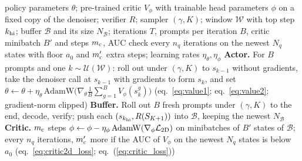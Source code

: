 \begin{algorithm}[t]
\caption{Joint training of the policy and critic.}
\label{alg:jpc}
\small
\begin{algorithmic}[1]
\REQUIRE policy parameters $\theta$; pre-trained critic $V_\phi$ with trainable head parameters $\phi$ on a fixed copy of the denoiser; verifier $R$; sampler $(\gamma,K)$; window $\mathcal W$ with top step $k_{\rm hi}$; buffer $\mathcal B$ and its size $N_{\mathcal B}$; iterations $T$, prompts per iteration $B$, critic minibatch $B'$ and steps $m_{\rm c}$, AUC check every $n_q$ iterations on the newest $N_q$ states with floor $a_0$ and $m'_{\rm c}$ extra steps; learning rates $\eta_\theta,\eta_\phi$
  \STATE \textbf{Actor.} For $B$ prompts and one $k\sim\mathcal U(\mathcal W)$: roll out under $(\gamma,K)$ to $s_{k-1}$ without gradients, take the denoiser call at $s_{k-1}$ with gradients to form $s_k$, and set $\theta\leftarrow\theta+\eta_\theta\,\mathrm{AdamW}\big(\nabla_\theta\frac1B\sum_{g=1}^{B}V_\phi(s^g_k)\big)$ \hfill (eq.~\ref{eq:value1}; eq.~\ref{eq:value2}; gradient-norm clipped)
  \STATE \textbf{Buffer.} Roll out $B$ fresh prompts under $(\gamma,K)$ to the end, decode, verify; push each $(s_{k_{\rm hi}},R(S_{K+1}))$ into $\mathcal B$, keeping the newest $N_{\mathcal B}$
  \STATE \textbf{Critic.} $m_{\rm c}$ steps $\phi\leftarrow\phi-\eta_\phi\,\mathrm{AdamW}(\nabla_\phi\mathcal L_{\rm 2D})$ on minibatches of $B'$ states of $\mathcal B$; every $n_q$ iterations, $m'_{\rm c}$ more if the AUC of $V_\phi$ on the newest $N_q$ states is below $a_0$ \hfill (eq.~\ref{eq:critic2d_loss}; eq.~(\ref{eq:critic_loss}))
\ENDFOR
\end{algorithmic}
\end{algorithm}



